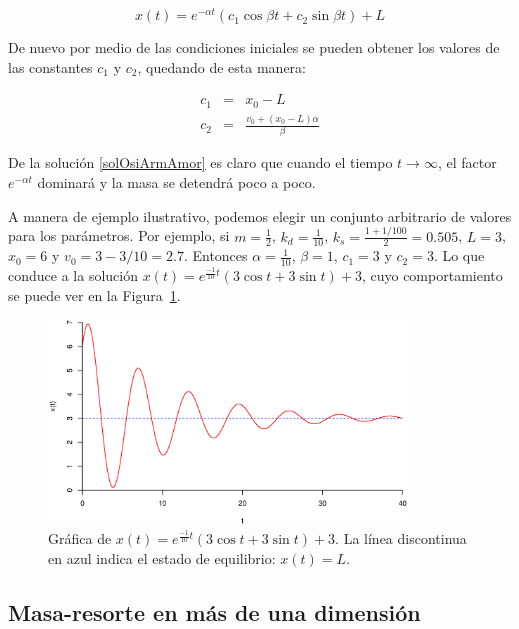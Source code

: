 \begin{equation}
\label{solOsiArmAmor} 
x(t) = e^{-\alpha t} \left( c_1 \cos{\beta t} + c_2 \sin{\beta t} \right) + L
\end{equation}

De nuevo por medio de las condiciones iniciales se pueden obtener los valores de las constantes $c_1$ y $c_2$, quedando de esta manera:

\begin{eqnarray}
c_1 & = & x_0 - L \nonumber \\
c_2 & = & \frac{v_0 + \left( x_0 - L \right) \alpha }{\beta } \nonumber 
\end{eqnarray}

De la solución \eqref{solOsiArmAmor} es claro que cuando el tiempo $t \rightarrow \infty $, el factor $e^{-\alpha t}$ dominará y la masa se detendrá poco a poco.

A manera de ejemplo ilustrativo, podemos elegir un conjunto arbitrario de valores para los parámetros. 
Por ejemplo, si $m = \frac{1}{2}$, $k_d = \frac{1}{10}$, $k_s = \frac{1 + 1 / 100}{2} = 0.505$, $L = 3$, $x_0 = 6$ y $v_0 = 3 - 3/10 = 2.7$.
Entonces $\alpha = \frac{1}{10}$, $\beta = 1$, $c_1 = 3$ y $c_2 = 3$.
Lo que conduce a la solución $x(t) = e^{\frac{-1}{10}t} \left( 3 \cos{t} + 3 \sin{t} \right) + 3$, cuyo comportamiento se puede ver en la Figura~\ref{OsciAmor:fig}.

\begin{figure}[htb]
 \centering
 \includegraphics[width=0.85\textwidth]{img/01/oscilador_amortiguado}
 \caption[Plano fase del oscilador armónico amortiguado]{ 
 Gráfica de $x(t) = e^{\frac{-1}{10}t} \left( 3 \cos{t} + 3 \sin{t} \right) + 3$. La línea discontinua en azul indica el estado de equilibrio: $x(t) = L$.
 } \label{OsciAmor:fig}
\end{figure}

\subsection{Masa-resorte en más de una dimensión}

